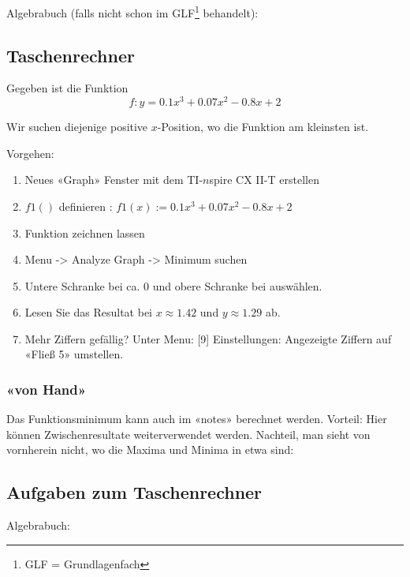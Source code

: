 Algebrabuch (falls nicht schon im GLF\footnote{GLF = Grundlagenfach} behandelt):

\newpage


\subsection{Taschenrechner}
Gegeben ist die Funktion
$$f: y = 0.1 x^3 + 0.07 x^2 - 0.8 x + 2$$

Wir suchen diejenige positive $x$-Position, wo die Funktion am kleinsten ist.

Vorgehen:
\begin{enumerate}
\item Neues «Graph» Fenster mit dem TI-$n$spire CX II-T erstellen
\item $f1()$ definieren : $f1(x) := 0.1 x^3 + 0.07 x^2 - 0.8 x + 2$
\item Funktion zeichnen lassen
\item Menu -> Analyze Graph -> Minimum suchen
\item Untere Schranke bei ca. 0 und obere Schranke bei  auswählen.
\item Lesen Sie das Resultat bei $x\approx 1.42$ und $y\approx 1.29$ ab.
  \item Mehr Ziffern gefällig? Unter Menu: [9] Einstellungen: Angezeigte Ziffern auf \zB «Fließ 5» umstellen.
\end{enumerate}


\subsubsection{«von Hand»}
Das Funktionsminimum kann auch im «notes» berechnet werden. Vorteil: Hier können Zwischenresultate weiterverwendet werden. Nachteil, man sieht von vornherein nicht, wo die Maxima und Minima in etwa sind:




\subsection*{Aufgaben zum Taschenrechner}

Algebrabuch:



